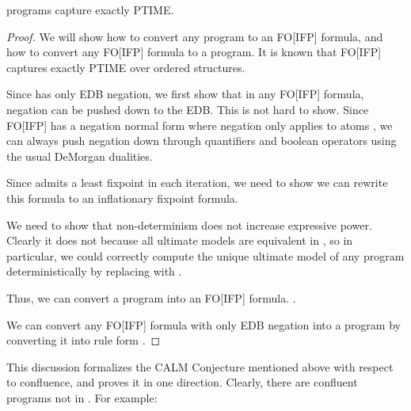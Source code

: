 \begin{theorem}
\slang programs capture exactly PTIME.
\end{theorem}
\begin{proof}
We will show how to convert any \slang program to an FO[IFP] formula, and how to convert any FO[IFP] formula to a \slang program.  It is known that FO[IFP] captures exactly PTIME over ordered structures.

Since \slang has only EDB negation, we first show that in any FO[IFP] formula, negation can be pushed down to the EDB.  This is not hard to show.  Since FO[IFP] has a negation normal form where negation only applies to atoms , we can always push negation down through quantifiers and boolean operators using the usual DeMorgan dualities.  

Since \slang admits a least fixpoint in each iteration, we need to show we can rewrite this formula to an inflationary fixpoint formula.  

We need to show that non-determinism does not increase expressive power.  Clearly it does not because all ultimate models are equivalent in \slang, so in particular, we could correctly compute the unique ultimate model of any \slang program deterministically by replacing  with .

Thus, we can convert a \slang program into an FO[IFP] formula. .

We can convert any FO[IFP] formula with only EDB negation into a \slang program by converting it into rule form .
\end{proof}



This discussion formalizes the CALM Conjecture mentioned above with respect to confluence, and proves it in one direction.
Clearly, there are confluent programs not in \slang.  For example:

